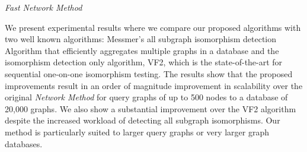  \textit{Fast  Network Method}

We present experimental results where we compare our proposed algorithms with two well known algorithms: Messmer's all subgraph isomorphism detection Algorithm that efficiently aggregates multiple graphs in a database and the isomorphism detection only algorithm, VF2, which is the state-of-the-art for sequential one-on-one isomorphism testing. The results show that the proposed improvements result in an order of magnitude improvement in scalability over the original \textit{Network Method}  for query graphs of up to 500 nodes to a database of 20,000 graphs. We also show a substantial improvement over the VF2 algorithm despite the increased workload of detecting all subgraph isomorphisms. Our method is particularly suited to larger query graphs or very larger graph databases.

